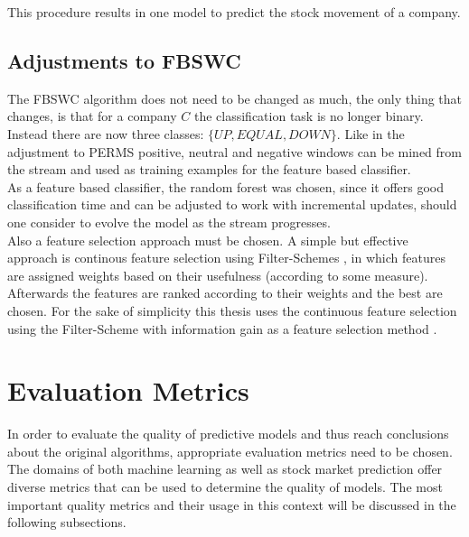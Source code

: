 This procedure results in one model to predict the stock movement of a company.

\subsection{Adjustments to FBSWC}
The FBSWC algorithm does not need to be changed as much, the only thing that changes, is that for a company $C$ the classification task is no longer binary. Instead there are now three classes: $\{UP,EQUAL,DOWN\}$. Like in the adjustment to PERMS positive, neutral and negative windows can be mined from the stream and used as training examples for the feature based classifier. \\
As a feature based classifier, the random forest was chosen, since it offers good classification time and can be adjusted to work with incremental updates, should one consider to evolve the model as the stream progresses.\\
Also a feature selection approach must be chosen. A simple but effective approach is continous feature selection using Filter-Schemes \cite{molina2002feature}, in which features are assigned weights based on their usefulness (according to some measure). Afterwards the features are ranked according to their weights and the best are chosen. For the sake of simplicity this thesis uses the continuous feature selection using the Filter-Scheme with information gain as a feature selection method \cite{yang1997comparative}. 

\section{Evaluation Metrics}
\label{sec_evaluationMetrics}

In order to evaluate the quality of predictive models and thus reach conclusions about the original algorithms, appropriate evaluation metrics need to be chosen. The domains of both machine learning as well as stock market prediction offer diverse metrics that can be used to determine the quality of models. The most important quality metrics and their usage in this context will be discussed in the following subsections.

